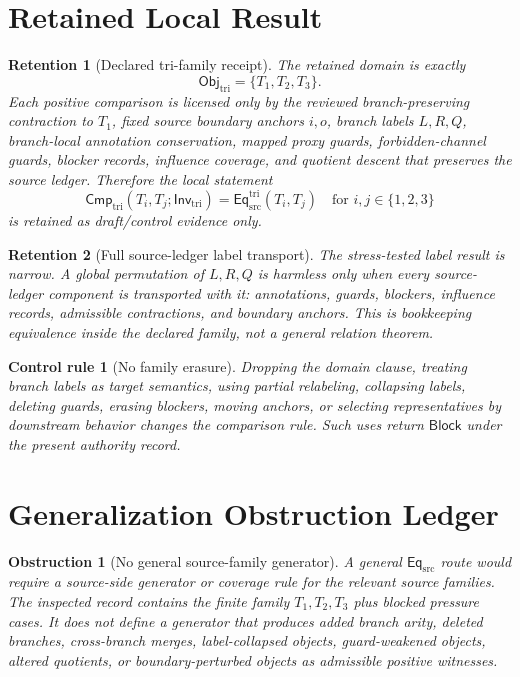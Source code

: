 \documentclass[11pt]{article}
\newcommand{\EqSrc}{\mathsf{Eq}_{\mathrm{src}}}
\newcommand{\EqTri}{\mathsf{Eq}_{\mathrm{src}}^{\mathrm{tri}}}
\newcommand{\ObjTri}{\mathsf{Obj}_{\mathrm{tri}}}
\newcommand{\InvTri}{\mathsf{Inv}_{\mathrm{tri}}}
\newcommand{\CmpTri}{\mathsf{Cmp}_{\mathrm{tri}}}
\newcommand{\Block}{\mathsf{Block}}
\newtheorem{retention}{Retention}
\newtheorem{obstruction}{Obstruction}
\newtheorem{controlrule}{Control rule}
\begin{document}
\section{Retained Local Result}

\begin{retention}[Declared tri-family receipt]
The retained domain is exactly
\[
    \ObjTri=\{T_{1},T_{2},T_{3}\}.
\]
Each positive comparison is licensed only by the reviewed
branch-preserving contraction to \(T_{1}\), fixed source boundary
anchors \(i,o\), branch labels \(L,R,Q\), branch-local annotation
conservation, mapped proxy guards, forbidden-channel guards, blocker
records, influence coverage, and quotient descent that preserves the
source ledger. Therefore the local statement
\[
    \CmpTri(T_i,T_j;\InvTri)=\EqTri(T_i,T_j)
    \quad\text{for } i,j\in\{1,2,3\}
\]
is retained as draft/control evidence only.
\end{retention}

\begin{retention}[Full source-ledger label transport]
The stress-tested label result is narrow. A global permutation of
\(L,R,Q\) is harmless only when every source-ledger component is
transported with it: annotations, guards, blockers, influence records,
admissible contractions, and boundary anchors. This is bookkeeping
equivalence inside the declared family, not a general relation theorem.
\end{retention}

\begin{controlrule}[No family erasure]
Dropping the domain clause, treating branch labels as target semantics,
using partial relabeling, collapsing labels, deleting guards, erasing
blockers, moving anchors, or selecting representatives by downstream
behavior changes the comparison rule. Such uses return \(\Block\) under
the present authority record.
\end{controlrule}

\section{Generalization Obstruction Ledger}

\begin{obstruction}[No general source-family generator]
A general \(\EqSrc\) route would require a source-side generator or
coverage rule for the relevant source families. The inspected record
contains the finite family \(T_{1},T_{2},T_{3}\) plus blocked pressure
cases. It does not define a generator that produces added branch arity,
deleted branches, cross-branch merges, label-collapsed objects,
guard-weakened objects, altered quotients, or boundary-perturbed
objects as admissible positive witnesses.
\end{obstruction}
\end{document}
